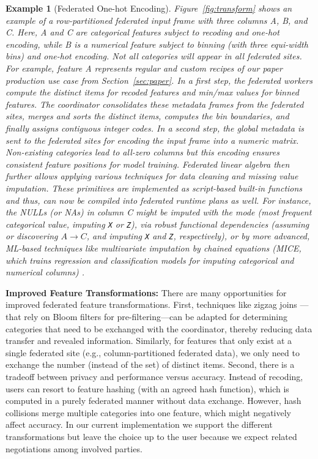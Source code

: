 \documentclass[sigconf,screen]{acmart}
\newtheorem{example}{Example}
\begin{document}
\begin{example}[Federated One-hot Encoding]
Figure~\ref{fig:transform} shows an example of a row-partitioned federated input frame with three columns A, B, and C. Here, A and C are categorical features subject to recoding and one-hot encoding, while B is a numerical feature subject to binning (with three equi-width bins) and one-hot encoding. Not all categories will appear in all federated sites. For example, feature A represents regular and custom recipes of our paper production use case from Section~\ref{sec:paper}. In a first step, the federated workers compute the distinct items for recoded features and min/max values for binned features. The coordinator consolidates these metadata frames from the federated sites, merges and sorts the distinct items, computes the bin boundaries, and finally assigns contiguous integer codes. In a second step, the global metadata is sent to the federated sites for encoding the input frame into a numeric matrix. Non-existing categories lead to all-zero columns but this encoding ensures consistent feature positions for model training. Federated linear algebra then further allows applying various techniques for data cleaning and missing value imputation. These primitives are implemented as script-based built-in functions and thus, can now be compiled into federated runtime plans as well. For instance, the NULLs (or NAs) in column C might be imputed with the mode (most frequent categorical value, imputing \texttt{X} or \texttt{Z}), via robust functional dependencies \cite{DengFAWSEIMO017} (assuming or discovering $A \rightarrow C$, and imputing \texttt{X} and \texttt{Z}, respectively), or by more advanced, ML-based techniques like multivariate imputation by chained equations (MICE, which trains regression and classification models for imputing categorical and numerical columns) \cite{JSSv045i03,CambroneroFSM17}. 
\end{example}

\textbf{Improved Feature Transformations:} There are many opportunities for improved federated feature transformations. First, techniques like zigzag joins \cite{TianOZGP16}---that rely on Bloom filters for pre-filtering---can be adapted for determining categories that need to be exchanged with the coordinator, thereby reducing data transfer and revealed information. Similarly, for features that only exist at a single federated site (e.g., column-partitioned federated data), we only need to exchange the number (instead of the set) of distinct items. Second, there is a tradeoff between privacy and performance versus accuracy. Instead of recoding, users can resort to feature hashing (with an agreed hash function), which is computed in a purely federated manner without data exchange. However, hash collisions merge multiple categories into one feature, which might negatively affect accuracy. In our current implementation we support the different transformations but leave the choice up to the user because we expect related negotiations among involved parties.
\end{document}

